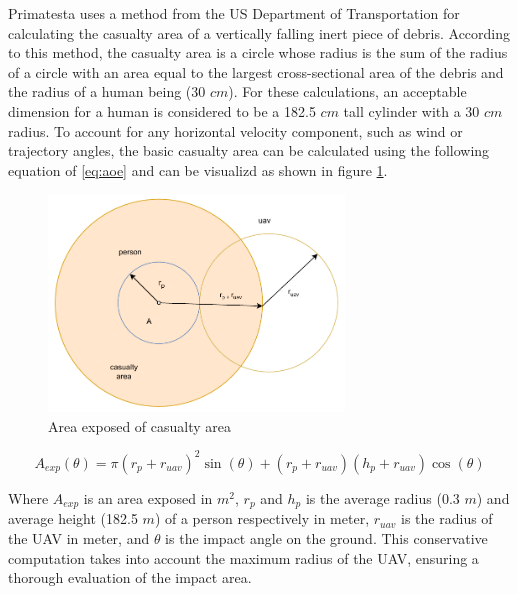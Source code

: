 \documentclass[12pt]{report}
\begin{document}
            Primatesta uses a method from the US Department of Transportation \cite{faa_expected_2000} for calculating
            the casualty area of a vertically falling inert piece of debris. According to this method, the casualty area
            is a circle whose radius is the sum of the radius of a circle with an area equal to the largest
            cross-sectional area of the debris and the radius of a human being (30 \(cm\)). For these calculations, an
            acceptable dimension for a human is considered to be a 182.5 \(cm\) tall cylinder with a 30 \(cm\) radius.
            To account for any horizontal velocity component, such as wind or trajectory angles, the basic casualty area
            can be calculated using the following equation of \ref{eq:aoe} and can be visualizd as shown in figure
            \ref{fig:aoe}.

            \begin{figure}[H]
                \centering
                \includegraphics[width=0.7\textwidth]{General Image/OSM Drone-Area Exposed.pdf}
                \caption{Area exposed of casualty area}
                \label{fig:aoe}
            \end{figure}

            \begin{equation}\label{eq:aoe}
                A_{exp}(\theta) = \pi (r_p + r_{uav})^2 \sin (\theta) + (r_p + r_{uav})(h_p + r_{uav}) \cos (\theta)
            \end{equation}

            Where \(A_{exp}\) is an area exposed in \(m^2 \), $r_p$ and \(h_p\) is the average radius (0.3 \(m\)) and
            average height (182.5 \(m\)) of a person respectively in meter, $r_{uav}$ is the radius of the UAV in meter,
            and $\theta$ is the impact angle on the ground. This conservative computation takes into account the maximum
            radius of the UAV, ensuring a thorough evaluation of the impact area.
\end{document}
